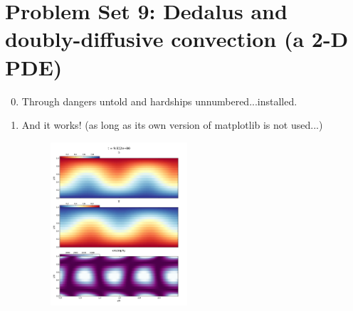 \documentclass[10pt, preprint]{aastex}
\begin{document}
\section*{Problem Set 9: Dedalus and doubly-diffusive convection (a 2-D PDE)}
\begin{enumerate}
\setcounter{enumi}{-1}
\item Through dangers untold and hardships unnumbered...installed.

\item And it works! (as long as its own version of matplotlib is not used...)
\begin{figure}[!ht]
  \centering
  \includegraphics[width=2in]{TS/snapshot_000190.png}
\end{figure}


\end{enumerate}
\end{document}
